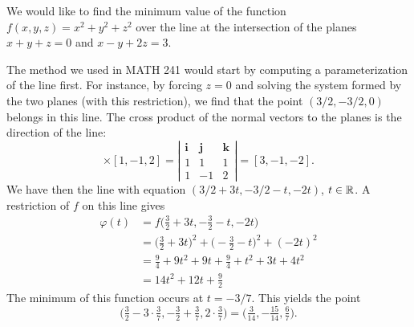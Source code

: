 \begin{example}\label{example:ProjMethods}
We would like to find the minimum value of the function $f(x,y,z)=x^2+y^2+z^2$ over the line at the intersection of the planes $x+y+z=0$ and $x-y+2z=3$.  

The method we used in MATH 241 would start by computing a parameterization of the line first.  For instance, by forcing $z=0$ and solving the system formed by the two planes (with this restriction), we find that the point $(3/2,-3/2,0)$ belongs in this line.  The cross product of the normal vectors to the planes is the direction of the line: 
\begin{equation*}
[1,1,1] \times [1,-1,2] = \left\lvert \begin{matrix} \boldsymbol{i} & \boldsymbol{j} & \boldsymbol{k} \\ 1 & 1 & 1 \\ 1 & -1 & 2 \end{matrix} \right\rvert= [3,-1,-2].
\end{equation*}
We have then the line with equation $(3/2+3t, -3/2-t, -2t)$, $t\in \mathbb{R}$.  A restriction of $f$ on this line gives
\begin{align*}
\varphi(t) &= f \big(\tfrac{3}{2}+3t, -\tfrac{3}{2}-t, -2t \big) \\
           &= \big( \tfrac{3}{2}  + 3t \big)^2 + \big( -\tfrac{3}{2} - t \big)^2 + (-2t)^2 \\
           &= \tfrac{9}{4} + 9t^2 + 9t + \tfrac{9}{4} + t^2 + 3t + 4t^2 \\
           &= 14t^2 + 12t + \tfrac{9}{2}
\end{align*}
The minimum of this function occurs at $t=-3/7$.  This yields the point 
\begin{equation*}
\big( \tfrac{3}{2} - 3 \cdot\tfrac{3}{7}, -\tfrac{3}{2} + \tfrac{3}{7}, 2\cdot \tfrac{3}{7} \big) = \big( \tfrac{3}{14}, -\tfrac{15}{14}, \tfrac{6}{7} \big).
\end{equation*}


\end{example}
